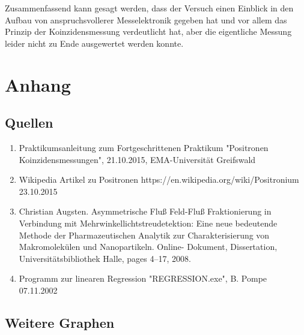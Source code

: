 \documentclass[numbers=noenddot,12pt,a4paper]{scrartcl}
\begin{document}
		
		Zusammenfassend kann gesagt werden, dass der Versuch einen Einblick in den Aufbau von anspruchsvollerer Messelektronik gegeben hat und vor allem das Prinzip der Koinzidensmessung verdeutlicht hat, aber die eigentliche Messung leider nicht zu Ende ausgewertet werden konnte. 
		\newpage

\section{Anhang}
\subsection{Quellen}
\begin{enumerate}
	\item Praktikumsanleitung zum Fortgeschrittenen Praktikum "Positronen Koinzidensmessungen", 21.10.2015, EMA-Universität Greifswald
	\item Wikipedia Artikel zu Positronen https://en.wikipedia.org/wiki/Positronium 23.10.2015
	\item Christian Augsten. Asymmetrische Fluß Feld-Fluß Fraktionierung in Verbindung mit
	Mehrwinkellichtstreudetektion: Eine neue bedeutende Methode der Pharmazeutischen
	Analytik zur Charakterisierung von Makromolekülen und Nanopartikeln. Online-
	Dokument, Dissertation, Universitätsbibliothek Halle, pages 4–17, 2008.
	\item Programm zur linearen Regression "REGRESSION.exe", B. Pompe 07.11.2002
\end{enumerate}
\subsection{Weitere Graphen}
\end{document}
